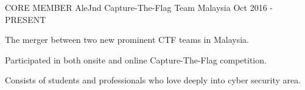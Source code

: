 

\begin{cventries}

    \cventry
    {CORE MEMBER}
    {AleJnd Capture-The-Flag Team}
    {Malaysia}
    {Oct 2016 - PRESENT}
    {
      \begin{cvitems}
        \item {The merger between two new prominent CTF teams in Malaysia.}
        \item {Participated in both onsite and online Capture-The-Flag competition.}
        \item {Consists of students and professionals who love deeply into cyber security area.}
      \end{cvitems}
    }
\end{cventries}
